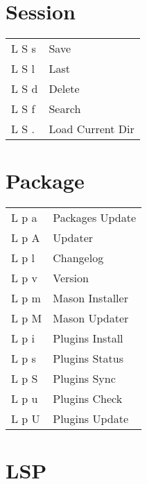 \documentclass[
  ,landscape
  ,columns=4
]{cheatsheet}
\begin{document}
\section{Session}

\begin{tabular}{ll}
	L S s & Save             \\
	L S l & Last             \\
	L S d & Delete           \\
	L S f & Search           \\
	L S . & Load Current Dir \\
\end{tabular}

\section{Package}

\begin{tabular}{ll}
	L p a & Packages Update \\
	L p A & Updater         \\
	L p l & Changelog       \\
	L p v & Version         \\
	L p m & Mason Installer \\
	L p M & Mason Updater   \\
	L p i & Plugins Install \\
	L p s & Plugins Status  \\
	L p S & Plugins Sync    \\
	L p u & Plugins Check   \\
	L p U & Plugins Update  \\
\end{tabular}

\section{LSP}
\end{document}
